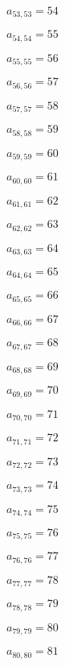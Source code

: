 \documentclass[a4paper,12pt]{article}
\begin{document}
$a _{ 53, 53 } = 54$

$a _{ 54, 54 } = 55$

$a _{ 55, 55 } = 56$

$a _{ 56, 56 } = 57$

$a _{ 57, 57 } = 58$

$a _{ 58, 58 } = 59$

$a _{ 59, 59 } = 60$

$a _{ 60, 60 } = 61$

$a _{ 61, 61 } = 62$

$a _{ 62, 62 } = 63$

$a _{ 63, 63 } = 64$

$a _{ 64, 64 } = 65$

$a _{ 65, 65 } = 66$

$a _{ 66, 66 } = 67$

$a _{ 67, 67 } = 68$

$a _{ 68, 68 } = 69$

$a _{ 69, 69 } = 70$

$a _{ 70, 70 } = 71$

$a _{ 71, 71 } = 72$

$a _{ 72, 72 } = 73$

$a _{ 73, 73 } = 74$

$a _{ 74, 74 } = 75$

$a _{ 75, 75 } = 76$

$a _{ 76, 76 } = 77$

$a _{ 77, 77 } = 78$

$a _{ 78, 78 } = 79$

$a _{ 79, 79 } = 80$

$a _{ 80, 80 } = 81$
\end{document}
